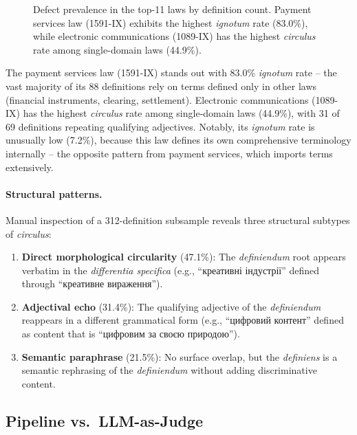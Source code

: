\documentclass[11pt]{article}
\begin{document}
\begin{figure}[t]
\centering

\caption{Defect prevalence in the top-11 laws by definition count. Payment services law (1591-IX) exhibits the highest \emph{ignotum} rate (83.0\%), while electronic communications (1089-IX) has the highest \emph{circulus} rate among single-domain laws (44.9\%).}
\label{fig:domain}
\end{figure}

The payment services law (1591-IX) stands out with 83.0\% \emph{ignotum} rate -- the vast majority of its 88 definitions rely on terms defined only in other laws (financial instruments, clearing, settlement).
Electronic communications (1089-IX) has the highest \emph{circulus} rate among single-domain laws (44.9\%), with 31 of 69 definitions repeating qualifying adjectives.
Notably, its \emph{ignotum} rate is unusually low (7.2\%), because this law defines its own comprehensive terminology internally -- the opposite pattern from payment services, which imports terms extensively.

\paragraph{Structural patterns.}
Manual inspection of a 312-definition subsample reveals three structural subtypes of \emph{circulus}:

\begin{enumerate}[nosep,leftmargin=*]
  \item \textbf{Direct morphological circularity} (47.1\%): The \emph{definiendum} root appears verbatim in the \emph{differentia specifica} (e.g., \foreignlanguage{ukrainian}{``креативні індустрії''} defined through \foreignlanguage{ukrainian}{``креативне вираження''}).
  \item \textbf{Adjectival echo} (31.4\%): The qualifying adjective of the \emph{definiendum} reappears in a different grammatical form (e.g., \foreignlanguage{ukrainian}{``цифровий контент''} defined as content that is \foreignlanguage{ukrainian}{``цифровим за своєю природою''}).
  \item \textbf{Semantic paraphrase} (21.5\%): No surface overlap, but the \emph{definiens} is a semantic rephrasing of the \emph{definiendum} without adding discriminative content.
\end{enumerate}

\subsection{Pipeline vs.\ LLM-as-Judge}
\label{sec:exp-llm}
\end{document}
